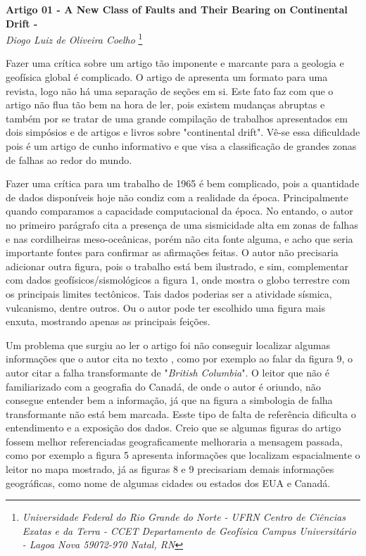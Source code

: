 \documentclass[manuscript]{geophysics}[10pt]
\begin{document}
\begin{center}
\textbf{\LARGE
 Artigo 01 - A New Class of Faults and Their Bearing on Continental Drift - \cite{wilson_new_1965}} \\
\textit{Diogo Luiz de Oliveira Coelho}
\footnote{\textit{Universidade Federal do Rio Grande do Norte - UFRN
Centro de Ciências Exatas e da Terra - CCET
Departamento de Geofísica
Campus Universitário - Lagoa Nova
59072-970 Natal, RN}}
\end{center} 


Fazer uma crítica sobre um artigo tão imponente e marcante para a geologia e geofísica global é complicado. O artigo de \cite{wilson_new_1965} apresenta um formato para uma revista, logo não há uma separação de seções em si. Este fato faz com que o artigo não flua tão bem na hora de ler, pois existem mudanças abruptas e também por se tratar de uma grande compilação de trabalhos apresentados em dois simpósios e de artigos e livros sobre "continental drift". Vê-se essa dificuldade pois é um artigo de cunho informativo e que visa a classificação de grandes zonas de falhas ao redor do mundo. 

Fazer uma crítica para um trabalho de 1965 é bem complicado, pois a quantidade de dados disponíveis hoje não condiz com a realidade da época. Principalmente quando comparamos a capacidade computacional da época. No entando, o autor no primeiro parágrafo cita a presença de uma sismicidade alta em zonas de falhas e nas cordilheiras meso-oceânicas, porém não cita fonte alguma, e acho que seria importante fontes para confirmar as afirmações feitas. O autor não precisaria adicionar outra figura, pois o trabalho está bem ilustrado, e sim, complementar com dados geofísicos/sismológicos a figura 1, onde mostra o globo terrestre com os principais limites tectônicos. Tais dados poderias ser a atividade sísmica, vulcanismo, dentre outros. Ou o autor pode ter escolhido uma figura mais enxuta, mostrando apenas as principais feições.

Um problema que surgiu ao ler o artigo foi não conseguir localizar algumas informações que o autor cita no texto , como por exemplo ao falar da figura 9, o autor citar a falha transformante de "\textit{British Columbia}". O leitor que não é familiarizado com a geografia do Canadá, de onde o autor é oriundo, não consegue entender bem a informação, já que na figura a simbologia de falha transformante não está bem marcada. Esste tipo de falta de referência dificulta o entendimento e a exposição dos dados. Creio que se algumas figuras do artigo fossem melhor referenciadas geograficamente melhoraria a mensagem passada, como por exemplo a figura 5 apresenta informações que localizam espacialmente o leitor no mapa mostrado, já as figuras 8 e 9 precisariam demais informações geográficas, como nome de algumas cidades ou estados dos EUA e Canadá.
\end{document}

